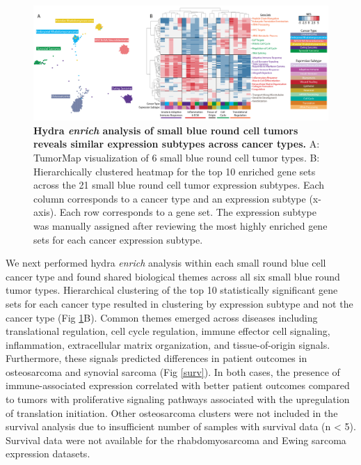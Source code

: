 \documentclass[10pt,letterpaper]{article}
\begin{document}
\begin{figure}[!h]
	\includegraphics[width=\textwidth]{img/PNG/hydra-pan-small-round-blue-V2-2x}
	\caption{{\bf Hydra \textit{enrich} analysis of small blue round cell tumors reveals similar expression subtypes across cancer types.} A: TumorMap visualization of 6 small blue round cell tumor types. B: Hierarchically clustered heatmap for the top 10 enriched gene sets across the 21 small blue round cell tumor expression subtypes. Each column corresponds to a cancer type and an expression subtype (x-axis). Each row corresponds to a gene set. The expression subtype was manually assigned after reviewing the most highly enriched gene sets for each cancer expression subtype.}
	\label{pancan}
\end{figure}

We next performed hydra \textit{enrich} analysis within each small round blue cell cancer type and found shared biological themes across all six small blue round tumor types. Hierarchical clustering of the top 10 statistically significant gene sets for each cancer type resulted in clustering by expression subtype and not the cancer type (Fig \ref{pancan}B). Common themes emerged across diseases including translational regulation, cell cycle regulation, immune effector cell signaling, inflammation, extracellular matrix organization, and tissue-of-origin signals. Furthermore, these signals predicted differences in patient outcomes in osteosarcoma and synovial sarcoma (Fig \ref{surv}). In both cases, the presence of immune-associated expression correlated with better patient outcomes compared to tumors with proliferative signaling pathways associated with the upregulation of translation initiation. Other osteosarcoma clusters were not included in the survival analysis due to insufficient number of samples with survival data (n < 5). Survival data were not available for the rhabdomyosarcoma and Ewing sarcoma expression datasets.

%
%
\end{document}
